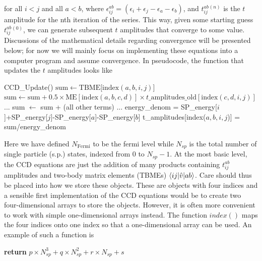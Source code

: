   for all $i < j$ and all $a < b$, where $\epsilon^{ab}_{ij} =
  \left(\epsilon_i+\epsilon_j-\epsilon_a-\epsilon_b\right)$, and
  $t_{ij}^{ab}{}^{(n)}$ is the $t$ amplitude for the nth iteration of
  the series. This way, given some starting guess
  $t_{ij}^{ab}{}^{(0)}$, we can generate subsequent $t$ amplitudes
  that converge to some value. Discussions of the mathematical details
  regarding convergence will be presented below; for now we will mainly focus
  on implementing these equations into a computer program and
  assume convergence. In pseudocode, the function that updates the $t$
  amplitudes looks like
\begin{svgraybox}
  \begin{algorithmic} 
  \State CCD\_Update()     \State $\text{sum} \gets
  \text{TBME}[\text{index}(a,b,i,j)$]  
  \State $\text{sum} \gets \text{sum} +
  0.5\times\text{ME}[\text{index}(a,b,c,d)] \times
  t\_\text{amplitudes}\_\text{old}[\text{index}(c,d,i,j)]$ \EndFor
  \EndFor \State ...  \State sum $\gets$ sum + (all other terms)
  \State ...  \State energy\_denom =
  SP\_energy[$i$]+SP\_energy[$j$]-SP\_energy[$a$]-SP\_energy[$b$]
  \State t\_amplitudes[index($a,b,i,j$)] = sum/energy\_denom \EndFor
  \EndFor \EndFor \EndFor
  \end{algorithmic}
\end{svgraybox} 
 Here we have defined $N_{\mathrm{Fermi}}$ to be the fermi level while $N_{sp}$ is the total
  number of single particle (s.p.) states, indexed from 0 to
  $N_{sp}-1$. At the most basic level, the CCD equations are just the
  addition of many products containing $t_{ij}^{ab}$ amplitudes and
  two-body matrix elements (TBMEs) $\braket{ij|\hat{v}|ab}$.
  Care should thus be placed into how we store these objects. These are
  objects with four indices and a  sensible first implementation
  of the CCD equations would be to create two four-dimensional arrays to store the
  objects. However, it is often more convenient to work with simple
  one-dimensional arrays instead. The function $index()$ maps the four
  indices onto one index so that a one-dimensional array can be used. An example
  of such a function is
\begin{svgraybox} 
 \begin{algorithmic}
   \State \textbf{return} $p\times N_{sp}^3 +
  q\times N_{sp}^2 + r\times N_{sp} + s$ \EndFunction
  \end{algorithmic}
\end{svgraybox}
